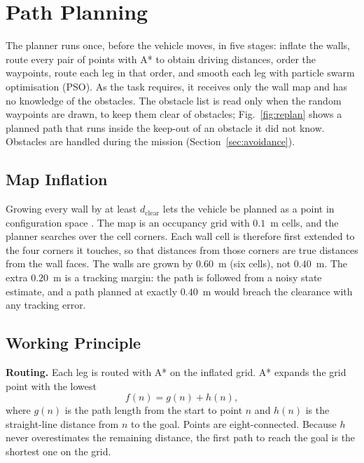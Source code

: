 \section{Path Planning}
\label{sec:planning}

The planner runs once, before the vehicle moves, in five stages: inflate
the walls, route every pair of points with A* to obtain driving
distances, order the waypoints, route each leg in that order, and smooth
each leg with particle swarm optimisation (PSO). As the task requires,
it receives only the wall map and has no knowledge of the obstacles. The
obstacle list is read only when the random waypoints are drawn, to keep
them clear of obstacles; Fig.~\ref{fig:replan} shows a planned path
that runs inside the keep-out of an obstacle it did not know. Obstacles are
handled during the mission (Section~\ref{sec:avoidance}).

\subsection{Map Inflation}
Growing every wall by at least $d_{\text{clear}}$ lets the vehicle be planned as
a point in configuration space \cite{sanchez2021}. The
map is an occupancy grid with $0.1$~m cells, and the planner searches
over the cell corners. Each wall cell is therefore first extended to the
four corners it touches, so that distances from those corners are true
distances from the wall faces. The walls are grown by $0.60$~m (six cells), not
$0.40$~m. The extra $0.20$~m is a tracking margin: the path is followed
from a noisy state estimate, and a path planned at exactly $0.40$~m
would breach the clearance with any tracking error.

\subsection{Working Principle}
\textbf{Routing.} Each leg is routed with A* \cite{sanchez2021} on the
inflated grid. A* expands the grid point with the lowest
\begin{equation}
    f(n) = g(n) + h(n),
    \label{eq:astar}
\end{equation}
where $g(n)$ is the path length from the start to point $n$ and $h(n)$
is the straight-line distance from $n$ to the goal. Points are
eight-connected. Because $h$ never overestimates the remaining distance,
the first path to reach the goal is the shortest one on the grid.

